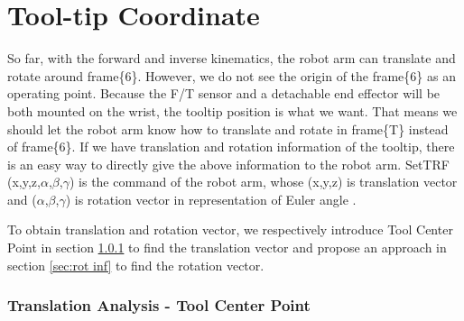 \section{Tool-tip Coordinate}
\label{sec:ref_robot}
\hspace*{6mm}So far, with the forward and inverse kinematics, the robot arm can translate and rotate around frame\{6\}. However, we do not see the origin of the frame\{6\} as an operating point. Because the F/T sensor and a detachable end effector will be both mounted on the wrist, the tooltip position is what we want. That means we should let the robot arm know how to translate and rotate in frame\{T\} instead of frame\{6\}. If we have translation and rotation information of the tooltip, there is an easy way to directly give the above information to the robot arm. SetTRF (x,y,z,$\alpha$,$\beta$,$\gamma$) is the command of the robot arm, whose (x,y,z) is translation vector and ($\alpha$,$\beta$,$\gamma$) is rotation vector in representation of Euler angle .
\par
To obtain translation and rotation vector, we respectively introduce Tool Center Point in section \ref{sec:tcp} to find the translation vector and propose an approach in section \ref{sec:rot inf} to find the rotation vector.							
\subsubsection{Translation Analysis - Tool Center Point}
\label{sec:tcp}

